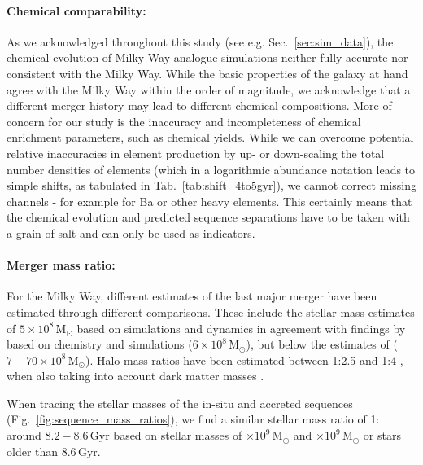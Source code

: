 \documentclass[fleqn,usenatbib]{mnras}
\begin{document}
\paragraph*{Chemical comparability:} As we acknowledged throughout this study (see e.g. Sec.~\ref{sec:sim_data}), the chemical evolution of Milky Way analogue simulations neither fully accurate nor consistent with the Milky Way. While the basic properties of the galaxy at hand agree with the Milky Way within the order of magnitude, we acknowledge that a different merger history may lead to different chemical compositions. More of concern for our study is the inaccuracy and incompleteness of chemical enrichment parameters, such as chemical yields. While we can overcome potential relative inaccuracies in element production by up- or down-scaling the total number densities of elements (which in a logarithmic abundance notation leads to simple shifts, as tabulated in Tab.~\ref{tab:shift_4to5gyr}), we cannot correct missing channels - for example for Ba or other heavy elements. This certainly means that the chemical evolution and predicted sequence separations have to be taken with a grain of salt and can only be used as indicators.

\paragraph*{Merger mass ratio:} For the Milky Way, different estimates of the last major merger have been estimated through different comparisons. These include the stellar mass estimates of $5\times10^{8}\,\mathrm{M_\odot}$ based on simulations and dynamics \citep{Naidu2021} in agreement with findings by \citet{Helmi2018} based on chemistry and simulations ($6\times 10^{8}\,\mathrm{M_\odot}$), but below the estimates of \citet{Feuillet2020} ($7-70\times10^{8}\,\mathrm{M_\odot}$). Halo mass ratios have been estimated between 1:2.5 \citep{Naidu2020} and 1:4 \citep{Helmi2018}, when also taking into account dark matter masses \citep[e.g. $2\times10^{11}\,\mathrm{M_\odot}$ for][]{Naidu2020}.

When tracing the stellar masses of the in-situ and accreted sequences (Fig.~\ref{fig:sequence_mass_ratios}), we find a similar stellar mass ratio of 1: around $8.2-8.6\,\mathrm{Gyr}$ based on stellar masses of $\times10^9\,\mathrm{M_\odot}$ and $\times10^9\,\mathrm{M_\odot}$ or stars older than $8.6\,\mathrm{Gyr}$.
\end{document}
